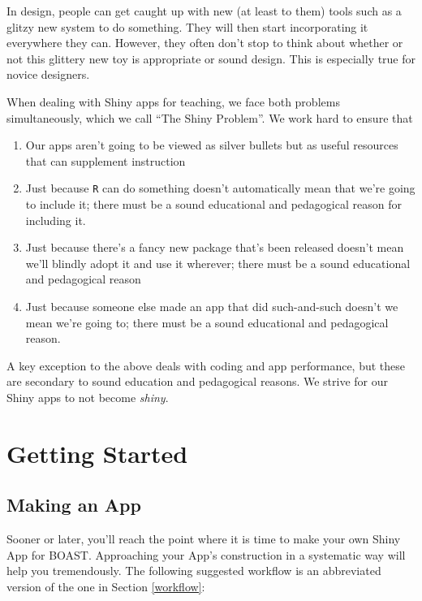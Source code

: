 \documentclass[
]{book}
\providecommand{\tightlist}{%
  \setlength{\itemsep}{0pt}\setlength{\parskip}{0pt}}
\begin{document}
In design, people can get caught up with new (at least to them) tools such as a glitzy new system to do something. They will then start incorporating it everywhere they can. However, they often don't stop to think about whether or not this glittery new toy is appropriate or sound design. This is especially true for novice designers.

When dealing with Shiny apps for teaching, we face both problems simultaneously, which we call ``The Shiny Problem''. We work hard to ensure that

\begin{enumerate}
\def\labelenumi{\arabic{enumi}.}
\tightlist
\item
  Our apps aren't going to be viewed as silver bullets but as useful resources that can supplement instruction
\item
  Just because \texttt{R} can do something doesn't automatically mean that we're going to include it; there must be a sound educational and pedagogical reason for including it.
\item
  Just because there's a fancy new package that's been released doesn't mean we'll blindly adopt it and use it wherever; there must be a sound educational and pedagogical reason
\item
  Just because someone else made an app that did such-and-such doesn't we mean we're going to; there must be a sound educational and pedagogical reason.
\end{enumerate}

A key exception to the above deals with coding and app performance, but these are secondary to sound education and pedagogical reasons. We strive for our Shiny apps to not become \emph{shiny}.

\hypertarget{part-getting-started}{%
\part{Getting Started}\label{part-getting-started}}

\setcounter{chapter}{0}

\hypertarget{makingApp}{%
\chapter{Making an App}\label{makingApp}}

Sooner or later, you'll reach the point where it is time to make your own Shiny App for BOAST. Approaching your App's construction in a systematic way will help you tremendously. The following suggested workflow is an abbreviated version of the one in Section \ref{workflow}:
\end{document}
